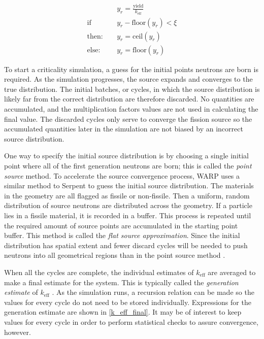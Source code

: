 \begin{equation}
\label{stoch_rounding}
\begin{split}
&y_r = \frac{\mathrm{yield}}{k_\mathrm{eff}} \\
\mathrm{if}\quad &y_r - \mathrm{floor}(y_r)<\xi \\
\mathrm{then:}\quad &y_r=\mathrm{ceil}(y_r) \\
\mathrm{else:}\quad &y_r=\mathrm{floor}(y_r)
\end{split}
\end{equation}

To start a criticality simulation, a guess for the initial points neutrons are born is required. As the simulation progresses, the source expands and converges to the true distribution.  The initial batches, or cycles, in which the source distribution is likely far from the correct distribution are therefore discarded.  No quantities are accumulated, and the multiplication factors values are not used in calculating the final value.  The discarded cycles only serve to converge the fission source so the accumulated quantities later in the simulation are not biased by an incorrect source distribution.  

One way to specify the initial source distribution is by choosing a single initial point where all of the first generation neutrons are born; this is called the \emph{point source} method. To accelerate the source convergence process, WARP uses a similar method to Serpent to guess the initial source distribution.  The materials in the geometry are all flagged as fissile or non-fissile.  Then a uniform, random distribution of source neutrons are distributed across the geometry.  If a particle lies in a fissile material, it is recorded in a buffer.  This process is repeated until the required amount of source points are accumulated in the starting point buffer.  This method is called the \emph{flat source approximation}. Since the initial distribution has spatial extent and fewer discard cycles will be needed to push neutrons into all geometrical regions than in the point source method \cite{jaakko}.

When all the cycles are complete, the individual estimates of $k_\mathrm{eff}$ are averaged to make a final estimate for the system.  This is typically called the \emph{generation estimate} of $k_\mathrm{eff}$ \cite{jaakko}.  As the simulation runs, a recursion relation can be made so the values for every cycle do not need to be stored individually.  Expressions for the generation estimate are shown in \eqref{k_eff_final}.  It may be of interest to keep values for every cycle in order to perform statistical checks to assure convergence, however.

